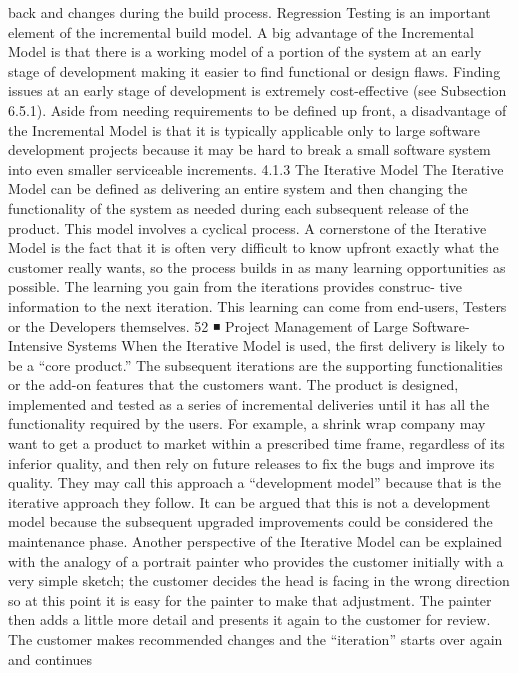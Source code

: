 \documentclass[a4paper,12pt]{book}
\begin{document}
back and changes during the build process. Regression Testing
is an important element of the incremental build model.
A big advantage of the Incremental Model is that there
is a working model of a portion of the system at an early
stage of development making it easier to find functional or
design flaws. Finding issues at an early stage of development
is extremely cost-effective (see Subsection 6.5.1). Aside from
needing requirements to be defined up front, a disadvantage
of the Incremental Model is that it is typically applicable
only to large software development projects because it may
be hard to break a small software system into even smaller
serviceable increments.
4.1.3 The Iterative Model
The Iterative Model can be defined as delivering an entire
system and then changing the functionality of the system
as needed during each subsequent release of the product.
This model involves a cyclical process. A cornerstone of the
Iterative Model is the fact that it is often very difficult to
know upfront exactly what the customer really wants, so the
process builds in as many learning opportunities as possible.
The learning you gain from the iterations provides construc-
tive information to the next iteration. This learning can come
from end-users, Testers or the Developers themselves.
52
◾
Project Management of Large Software-Intensive Systems
When the Iterative Model is used, the first delivery is
likely to be a “core product.” The subsequent iterations are
the supporting functionalities or the add-on features that the
customers want. The product is designed, implemented and
tested as a series of incremental deliveries until it has all the
functionality required by the users.
For example, a shrink wrap company may want to get a
product to market within a prescribed time frame, regardless
of its inferior quality, and then rely on future releases to fix
the bugs and improve its quality. They may call this approach
a “development model” because that is the iterative approach
they follow. It can be argued that this is not a development
model because the subsequent upgraded improvements could
be considered the maintenance phase.
Another perspective of the Iterative Model can be
explained with the analogy of a portrait painter who provides
the customer initially with a very simple sketch; the customer
decides the head is facing in the wrong direction so at this
point it is easy for the painter to make that adjustment. The
painter then adds a little more detail and presents it again to
the customer for review. The customer makes recommended
changes and the “iteration” starts over again and continues
\end{document}
